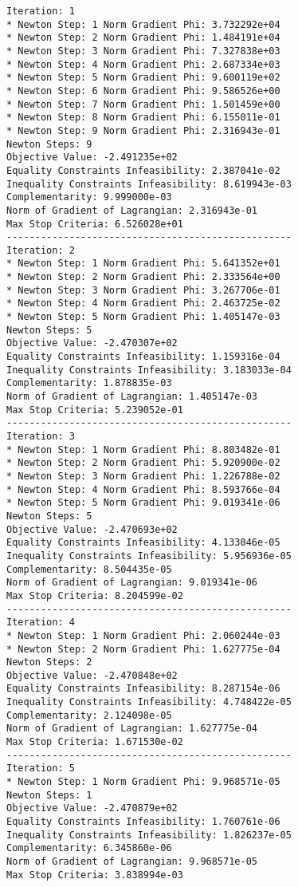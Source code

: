 \documentclass{article}
\begin{document}
\scriptsize
\begin{minipage}[t]{0.45\textwidth}
\begin{verbatim}
Iteration: 1
* Newton Step: 1 Norm Gradient Phi: 3.732292e+04
* Newton Step: 2 Norm Gradient Phi: 1.484191e+04
* Newton Step: 3 Norm Gradient Phi: 7.327838e+03
* Newton Step: 4 Norm Gradient Phi: 2.687334e+03
* Newton Step: 5 Norm Gradient Phi: 9.600119e+02
* Newton Step: 6 Norm Gradient Phi: 9.586526e+00
* Newton Step: 7 Norm Gradient Phi: 1.501459e+00
* Newton Step: 8 Norm Gradient Phi: 6.155011e-01
* Newton Step: 9 Norm Gradient Phi: 2.316943e-01
Newton Steps: 9
Objective Value: -2.491235e+02
Equality Constraints Infeasibility: 2.387041e-02
Inequality Constraints Infeasibility: 8.619943e-03
Complementarity: 9.999000e-03
Norm of Gradient of Lagrangian: 2.316943e-01
Max Stop Criteria: 6.526028e+01
--------------------------------------------------
Iteration: 2
* Newton Step: 1 Norm Gradient Phi: 5.641352e+01
* Newton Step: 2 Norm Gradient Phi: 2.333564e+00
* Newton Step: 3 Norm Gradient Phi: 3.267706e-01
* Newton Step: 4 Norm Gradient Phi: 2.463725e-02
* Newton Step: 5 Norm Gradient Phi: 1.405147e-03
Newton Steps: 5
Objective Value: -2.470307e+02
Equality Constraints Infeasibility: 1.159316e-04
Inequality Constraints Infeasibility: 3.183033e-04
Complementarity: 1.878835e-03
Norm of Gradient of Lagrangian: 1.405147e-03
Max Stop Criteria: 5.239052e-01
--------------------------------------------------
Iteration: 3
* Newton Step: 1 Norm Gradient Phi: 8.803482e-01
* Newton Step: 2 Norm Gradient Phi: 5.920900e-02
* Newton Step: 3 Norm Gradient Phi: 1.226788e-02
* Newton Step: 4 Norm Gradient Phi: 8.593766e-04
* Newton Step: 5 Norm Gradient Phi: 9.019341e-06
Newton Steps: 5
Objective Value: -2.470693e+02
Equality Constraints Infeasibility: 4.133046e-05
Inequality Constraints Infeasibility: 5.956936e-05
Complementarity: 8.504435e-05
Norm of Gradient of Lagrangian: 9.019341e-06
Max Stop Criteria: 8.204599e-02
--------------------------------------------------
Iteration: 4
* Newton Step: 1 Norm Gradient Phi: 2.060244e-03
* Newton Step: 2 Norm Gradient Phi: 1.627775e-04
Newton Steps: 2
Objective Value: -2.470848e+02
Equality Constraints Infeasibility: 8.287154e-06
Inequality Constraints Infeasibility: 4.748422e-05
Complementarity: 2.124098e-05
Norm of Gradient of Lagrangian: 1.627775e-04
Max Stop Criteria: 1.671530e-02
--------------------------------------------------
Iteration: 5
* Newton Step: 1 Norm Gradient Phi: 9.968571e-05
Newton Steps: 1
Objective Value: -2.470879e+02
Equality Constraints Infeasibility: 1.760761e-06
Inequality Constraints Infeasibility: 1.826237e-05
Complementarity: 6.345860e-06
Norm of Gradient of Lagrangian: 9.968571e-05
Max Stop Criteria: 3.838994e-03
\end{verbatim}
\end{minipage}
\end{document}
